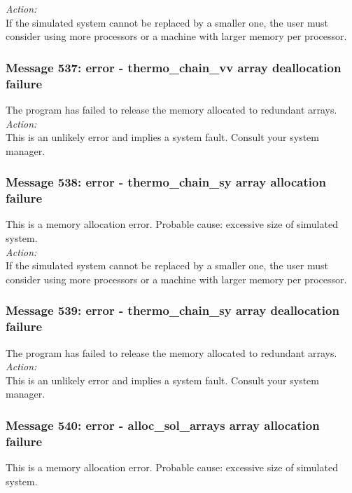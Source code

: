 \noindent
{\em Action:}\\
If the simulated system cannot be replaced by a smaller one, the user
must consider using more processors or a machine with larger memory
per processor.

\subsubsection*{Message 537: error - thermo\_chain\_vv array deallocation failure}

The program has failed to release the memory allocated to redundant arrays.\\

\noindent
{\em Action:}\\
This is an unlikely error and implies a system fault. Consult your system manager.

\subsubsection*{Message 538: error - thermo\_chain\_sy array allocation failure}

This is a memory allocation error. Probable cause: excessive size of
simulated system. \\

\noindent
{\em Action:}\\
If the simulated system cannot be replaced by a smaller one, the user
must consider using more processors or a machine with larger memory
per processor.

\subsubsection*{Message 539: error - thermo\_chain\_sy array deallocation failure}

The program has failed to release the memory allocated to redundant arrays.\\

\noindent
{\em Action:}\\
This is an unlikely error and implies a system fault. Consult your system manager.

\subsubsection*{Message 540: error - alloc\_sol\_arrays array allocation failure}

This is a memory allocation error. Probable cause: excessive size of
simulated system. \\

